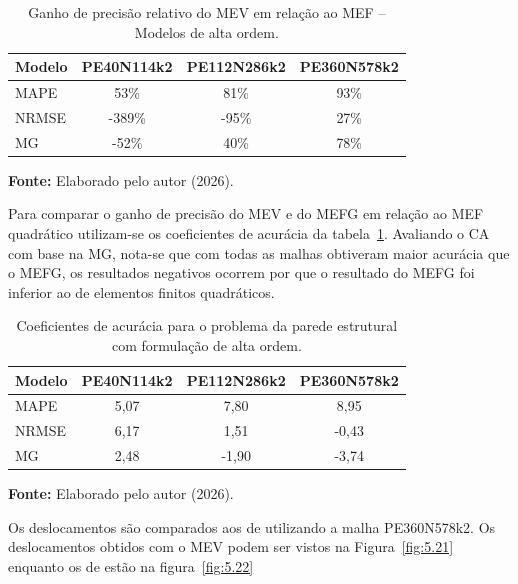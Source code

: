 \begin{table}[htbp]
    \centering
    \caption{Ganho de precisão relativo do MEV em relação ao MEF -- Modelos de alta ordem.}
    \label{tab:5.23}
    \small %
    \begin{tabular}{lccc}
        \toprule
        \textbf{Modelo} & \textbf{PE40N114k2} & \textbf{PE112N286k2} & \textbf{PE360N578k2} \\
        \midrule
        MAPE  & 53\%   & 81\%  & 93\% \\
        NRMSE & -389\% & -95\% & 27\% \\
        MG    & -52\%  & 40\%  & 78\% \\
        \bottomrule
    \end{tabular}
    
    \vspace{0.2cm}
    \raggedright
    \textbf{Fonte:} Elaborado pelo autor (2026).
\end{table}

\indent Para comparar o ganho de precisão do MEV e do MEFG em relação ao MEF quadrático utilizam-se os coeficientes de acurácia da tabela~\ref{tab:5.23}. Avaliando o CA com base na MG, nota-se que com todas as malhas obtiveram maior acurácia que o MEFG, os resultados negativos ocorrem por que o resultado do MEFG foi inferior ao de elementos finitos quadráticos.

\begin{table}[htbp]
    \centering
    \caption{Coeficientes de acurácia para o problema da parede estrutural com formulação de alta ordem.}
    \label{tab:524}
    \small %
    \begin{tabular}{lccc}
        \toprule
        \textbf{Modelo} & \textbf{PE40N114k2} & \textbf{PE112N286k2} & \textbf{PE360N578k2} \\
        \midrule
        MAPE  & 5,07 & 7,80  & 8,95  \\
        NRMSE & 6,17 & 1,51  & -0,43 \\
        MG    & 2,48 & -1,90 & -3,74 \\
        \bottomrule
    \end{tabular}
    
    \vspace{0.2cm}
    \raggedright
    \textbf{Fonte:} Elaborado pelo autor (2026).
\end{table}


\indent Os deslocamentos são comparados aos de \citet{nguyenthanh2010alternative} utilizando a malha PE360N578k2. Os deslocamentos obtidos com o MEV podem ser vistos na Figura~\ref{fig:5.21} enquanto os de \citet{nguyenthanh2010alternative} estão na figura~\ref{fig:5.22}

